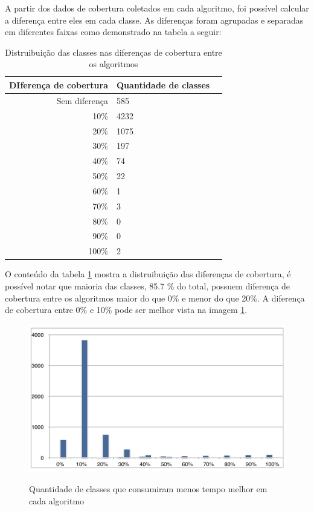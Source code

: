 \documentclass[
	12pt,				%
	oneside,			%
	a4paper,			%
	english,			%
	brazil				%
	]{abntex2ppgsi}
\begin{document}
A partir dos dados de cobertura coletados em cada algoritmo, foi possível calcular a diferença entre eles em cada classe. As diferenças foram agrupadas e separadas em diferentes faixas como demonstrado na tabela a seguir:



\begin{table}[h]

\centering
\caption{Distruibuição das classes nas diferenças de cobertura entre os algoritmos}
\vspace{0.5cm}
\begin{tabular}{r|lr}

DIferença de cobertura & Quantidade de classes \\ %
\hline                               %
Sem diferença  & 	585 \\
10\%	& 	4232 \\
20\%	& 	1075 \\
30\%	& 	197 \\
40\%	& 	74 \\
50\%	& 	22 \\
60\%	& 	1 \\
70\%	& 	3 \\
80\%	& 	0 \\
90\%	& 	0 \\
100\%	& 	2


\end{tabular}
\label{table:distribuicao-diferenca-cobertura-porcentagem}
\end{table}

O conteúdo da tabela \ref{table:distribuicao-diferenca-cobertura-porcentagem} mostra a distruibuição das diferenças de cobertura, é possível notar que maioria das classes, 85.7 \% do total, possuem diferença de cobertura entre os algoritmos maior do que 0\% e  menor do que 20\%. A diferença de cobertura entre 0\% e 10\% pode ser melhor vista na imagem \ref{fig:grafico_dif_cobertura}. 

\begin{figure}[H]%
	\centering
 	  \caption{Quantidade de classes que consumiram menos tempo melhor em cada algoritmo}
		\includegraphics[width=\textwidth]{grafico_dif_cobertura.png}
	\label{fig:grafico_dif_cobertura}
\end{figure}
\end{document}
